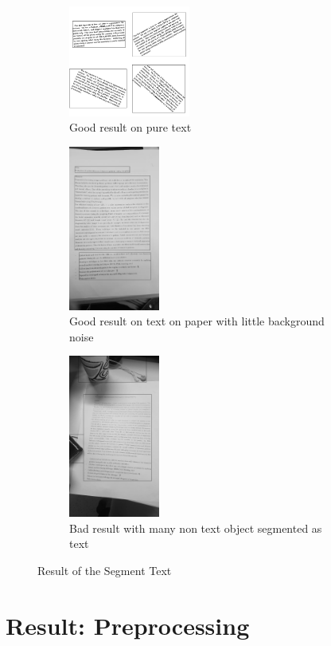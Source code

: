 \documentclass[Report.tex]{subfiles}
\begin{document}
\begin{figure}[ht]
  \centering
  \begin{subfigure}[t]{4cm}
    \includegraphics[width=4cm]{res/segment_text1.png}
    \caption{Good result on pure text}
  \end{subfigure}
  \hspace{7mm}%
  \begin{subfigure}[t]{4cm}
    \includegraphics[width=3cm]{res/segment_text2.png}
    \caption{Good result on text on paper with little background noise}
  \end{subfigure}
  \hspace{5mm}%
  \begin{subfigure}[t]{4cm}
    \includegraphics[width=3cm]{res/segment_text3.png}
    \caption{Bad result with many non text object segmented as text}
  \end{subfigure}
  \caption{Result of the Segment Text}
  \label{result:fig:Text_seg_result}
\end{figure}

\section{Result: Preprocessing}
\end{document}
